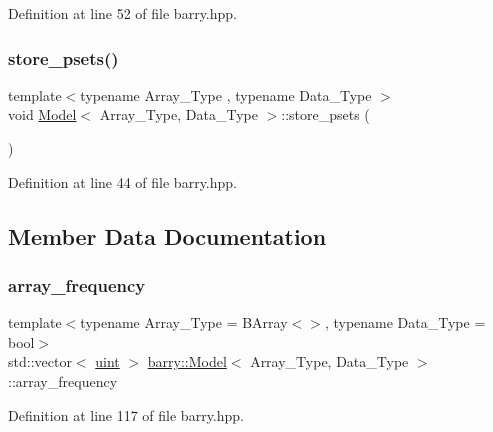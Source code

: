 Definition at line 52 of file barry.\+hpp.

\mbox{\label{classbarry_1_1_model_afd6d7130b41f92e5ec1984ea53c83720}} 
\subsubsection{\texorpdfstring{store\+\_\+psets()}{store\_psets()}}
{\footnotesize\ttfamily template$<$typename Array\+\_\+\+Type , typename Data\+\_\+\+Type $>$ \\
void \hyperlink{classbarry_1_1_model}{Model}$<$ Array\+\_\+\+Type, Data\+\_\+\+Type $>$\+::store\+\_\+psets (\begin{DoxyParamCaption}{ }\end{DoxyParamCaption})\hspace{0.3cm}{\ttfamily [inline]}}



Definition at line 44 of file barry.\+hpp.



\subsection{Member Data Documentation}
\mbox{\label{classbarry_1_1_model_a2f3a938709950efc2ff4685132d2cefb}} 
\subsubsection{\texorpdfstring{array\+\_\+frequency}{array\_frequency}}
{\footnotesize\ttfamily template$<$typename Array\+\_\+\+Type  = B\+Array$<$$>$, typename Data\+\_\+\+Type  = bool$>$ \\
std\+::vector$<$ \hyperlink{namespacebarry_a11dfc53ddb4672278319aa04f1e09a6c}{uint} $>$ \hyperlink{classbarry_1_1_model}{barry\+::\+Model}$<$ Array\+\_\+\+Type, Data\+\_\+\+Type $>$\+::array\+\_\+frequency}



Definition at line 117 of file barry.\+hpp.

\mbox{\label{classbarry_1_1_model_aadf6c5f35d59c4fe4c67f954ac1dab94}} 
